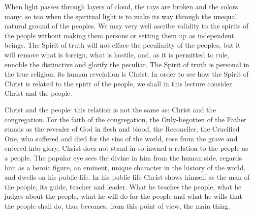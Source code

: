 \documentclass[12pt,a4paper,openany]{book}
\newcommand{\opage}[1]{\marginnote{\footnotesize\textit{[#1]}}}
\newcounter{lect}
\begin{document}
When light passes through layers of cloud, the rays are broken and the colors many; so too when the spiritual light is to make its way through
\setcounter{footnote}{0}%
\opage{20}the unequal natural ground of the peoples. We may very well ascribe validity to the spirits of the people without making them persons or setting them up as independent beings. The Spirit of truth will not efface the peculiarity of the peoples, but it will remove what is foreign, what is hostile, and, as it is permitted to rule, ennoble the distinctive and glorify the peculiar. The Spirit of truth is personal in the true religion; its human revelation is Christ. In order to see how the Spirit of Christ is related to the spirit of the people, we shall in this lecture consider Christ and the people.

Christ and the people: this relation is not the same as: Christ and the congregation. For the faith of the congregation, the Only-begotten of the Father stands as the revealer of God in flesh and blood, the Reconciler, the Crucified One, who suffered and died for the sins of the world, rose from the grave and entered into glory; Christ does not stand in so inward a relation to the people as a people. The popular eye sees the divine in him from the human side, regards him as a heroic figure, an eminent, unique character in the history of the world, and dwells on his public life. In his public life Christ shows himself as the man of the people, its guide, teacher and leader. What he teaches the people, what he judges about the people, what he will do for the people and what he wills that the people shall do, thus becomes, from this point of view, the main thing.
\end{document}
